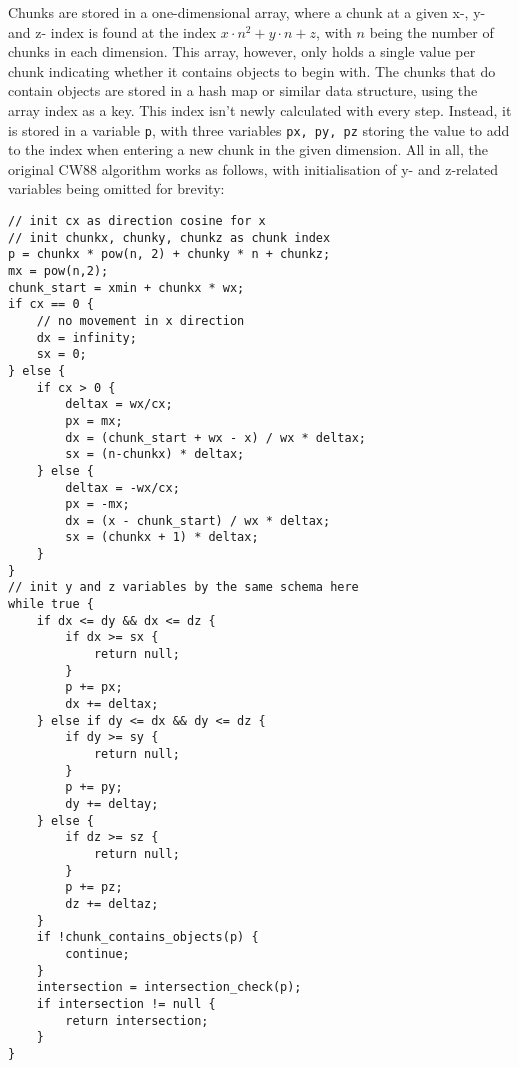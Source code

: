 \newline
Chunks are stored in a one-dimensional array,
where a chunk at a given x-, y- and z- index is found at the index \(x \cdot n^2 + y \cdot n + z\),
with \(n\) being the number of chunks in each dimension.
This array, however, only holds a single value per chunk indicating whether it contains objects to begin with.
The chunks that do contain objects are stored in a hash map or similar data structure,
using the array index as a key.
\newline
This index isn't newly calculated with every step.
Instead, it is stored in a variable \verb|p|,
with three variables \verb|px, py, pz| storing the value to add to the index when entering a new chunk in the given dimension.
\newline
All in all, the original CW88 algorithm works as follows,
with initialisation of y- and z-related variables being omitted for brevity:

\begin{verbatim}
// init cx as direction cosine for x
// init chunkx, chunky, chunkz as chunk index
p = chunkx * pow(n, 2) + chunky * n + chunkz;
mx = pow(n,2);
chunk_start = xmin + chunkx * wx;
if cx == 0 {
    // no movement in x direction
    dx = infinity;
    sx = 0;
} else {
    if cx > 0 {
        deltax = wx/cx;
        px = mx;
        dx = (chunk_start + wx - x) / wx * deltax;
        sx = (n-chunkx) * deltax;
    } else {
        deltax = -wx/cx;
        px = -mx;
        dx = (x - chunk_start) / wx * deltax;
        sx = (chunkx + 1) * deltax;
    }
}
// init y and z variables by the same schema here
while true {
    if dx <= dy && dx <= dz {
        if dx >= sx {
            return null;
        }
        p += px;
        dx += deltax;
    } else if dy <= dx && dy <= dz {
        if dy >= sy {
            return null;
        }
        p += py;
        dy += deltay;
    } else {
        if dz >= sz {
            return null;
        }
        p += pz;
        dz += deltaz;
    }
    if !chunk_contains_objects(p) {
        continue;
    }
    intersection = intersection_check(p);
    if intersection != null {
        return intersection;
    }
}
\end{verbatim}


